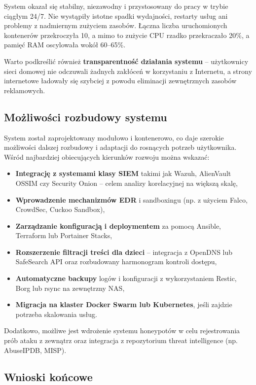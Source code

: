 \documentclass[
    left=2.5cm,         %
    right=2.5cm,        %
    top=2.5cm,          %
    bottom=3cm,         %
    bindingoffset=6mm,  %
    nohyphenation=true %
]{eiti/eiti-thesis} %
\begin{document}
System okazał się stabilny, niezawodny i przystosowany do pracy w trybie ciągłym 24/7. Nie wystąpiły istotne spadki wydajności, restarty usług ani problemy z nadmiernym zużyciem zasobów. Łączna liczba uruchomionych kontenerów przekroczyła 10, a mimo to zużycie CPU rzadko przekraczało 20\%, a pamięć RAM oscylowała wokół 60–65\%.

Warto podkreślić również \textbf{transparentność działania systemu} – użytkownicy sieci domowej nie odczuwali żadnych zakłóceń w korzystaniu z Internetu, a strony internetowe ładowały się szybciej z powodu eliminacji zewnętrznych zasobów reklamowych.

\subsection{Możliwości rozbudowy systemu}

System został zaprojektowany modułowo i kontenerowo, co daje szerokie możliwości dalszej rozbudowy i adaptacji do rosnących potrzeb użytkownika. Wśród najbardziej obiecujących kierunków rozwoju można wskazać:
\begin{itemize}
    \item \textbf{Integrację z systemami klasy SIEM} takimi jak Wazuh, AlienVault OSSIM czy Security Onion – celem analizy korelacyjnej na większą skalę,
    \item \textbf{Wprowadzenie mechanizmów EDR} i sandboxingu (np. z użyciem Falco, CrowdSec, Cuckoo Sandbox),
    \item \textbf{Zarządzanie konfiguracją i deploymentem} za pomocą Ansible, Terraform lub Portainer Stacks,
    \item \textbf{Rozszerzenie filtracji treści dla dzieci} – integracja z OpenDNS lub SafeSearch API oraz rozbudowany harmonogram kontroli dostępu,
    \item \textbf{Automatyczne backupy} logów i konfiguracji z wykorzystaniem Restic, Borg lub rsync na zewnętrzny NAS,
    \item \textbf{Migracja na klaster Docker Swarm lub Kubernetes}, jeśli zajdzie potrzeba skalowania usług.
\end{itemize}

Dodatkowo, możliwe jest wdrożenie systemu honeypotów w celu rejestrowania prób ataku z zewnątrz oraz integracja z repozytorium threat intelligence (np. AbuseIPDB, MISP).

\subsection{Wnioski końcowe}
\end{document}
